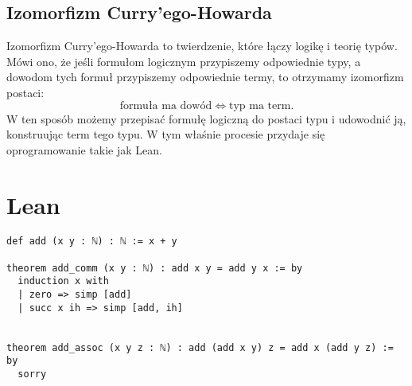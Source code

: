 \documentclass[polish,pretty]{angav}
\begin{document}
\subsection{Izomorfizm Curry'ego-Howarda}

Izomorfizm Curry'ego-Howarda to twierdzenie, które łączy logikę i teorię typów.
Mówi ono, że jeśli formułom logicznym przypiszemy odpowiednie typy, a dowodom tych formuł przypiszemy odpowiednie termy, to otrzymamy izomorfizm postaci:
\[ \text{formuła ma dowód} \iff \text{typ ma term}. \]
W ten sposób możemy przepisać formułę logiczną do postaci typu i udowodnić ją, konstruując term tego typu.
W tym właśnie procesie przydaje się oprogramowanie takie jak Lean.

\section{Lean}

\begin{verbatim}
def add (x y : ℕ) : ℕ := x + y

theorem add_comm (x y : ℕ) : add x y = add y x := by
  induction x with
  | zero => simp [add]
  | succ x ih => simp [add, ih]


theorem add_assoc (x y z : ℕ) : add (add x y) z = add x (add y z) := by
  sorry
\end{verbatim}
\end{document}
